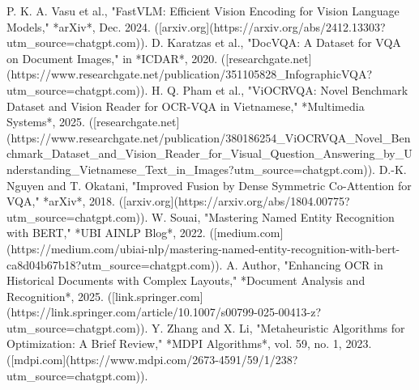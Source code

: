 \documentclass[conference]{IEEEtran}
\begin{document}
\begin{thebibliography}{99}
 P. K. A. Vasu et al., "FastVLM: Efficient Vision Encoding for Vision Language Models," *arXiv*, Dec. 2024. ([arxiv.org](https://arxiv.org/abs/2412.13303?utm_source=chatgpt.com)).
 D. Karatzas et al., "DocVQA: A Dataset for VQA on Document Images," in *ICDAR*, 2020. ([researchgate.net](https://www.researchgate.net/publication/351105828_InfographicVQA?utm_source=chatgpt.com)).
 H. Q. Pham et al., "ViOCRVQA: Novel Benchmark Dataset and Vision Reader for OCR-VQA in Vietnamese," *Multimedia Systems*, 2025. ([researchgate.net](https://www.researchgate.net/publication/380186254_ViOCRVQA_Novel_Benchmark_Dataset_and_Vision_Reader_for_Visual_Question_Answering_by_Understanding_Vietnamese_Text_in_Images?utm_source=chatgpt.com)).
 D.-K. Nguyen and T. Okatani, "Improved Fusion by Dense Symmetric Co-Attention for VQA," *arXiv*, 2018. ([arxiv.org](https://arxiv.org/abs/1804.00775?utm_source=chatgpt.com)).
 W. Souai, "Mastering Named Entity Recognition with BERT," *UBI AINLP Blog*, 2022. ([medium.com](https://medium.com/ubiai-nlp/mastering-named-entity-recognition-with-bert-ca8d04b67b18?utm_source=chatgpt.com)).
 A. Author, "Enhancing OCR in Historical Documents with Complex Layouts," *Document Analysis and Recognition*, 2025. ([link.springer.com](https://link.springer.com/article/10.1007/s00799-025-00413-z?utm_source=chatgpt.com)).
 Y. Zhang and X. Li, "Metaheuristic Algorithms for Optimization: A Brief Review," *MDPI Algorithms*, vol. 59, no. 1, 2023. ([mdpi.com](https://www.mdpi.com/2673-4591/59/1/238?utm_source=chatgpt.com)).
\end{thebibliography}
\end{document}
